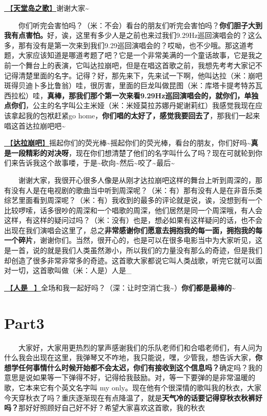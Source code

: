 \documentclass[]{ctexbook}
\begin{document}
\hyperref[haven-song]{🎵【\textbf{天堂岛之歌}】}谢谢大家\textasciitilde{}

  你们听完会害怕吗？（米：不会）看台的朋友们听完会害怕吗？\textbf{你们胆子大到我有点害怕。}好，诶，这里有多少人是之前也来过我们9.29Hz巡回演唱会的？这么多，那有没有是第一次来到我们9.29巡回演唱会的？哎呦，也不少哦。那这道考题，大家应该知道是哪道考题了吧？它是一个非常美满的一个童话故事，它是我之前一个舞台上的表演，它叫达拉崩吧，但是在唱这首歌之前，我想先考考大家记不记得清楚里面的名字。记得？好，那先来下，先来试一下啊，他叫达拉（米：崩吧斑得贝迪卜多比鲁翁）哇，很厉害，里面的巨龙叫做昆图（米：库塔卡提考特苏瓦西拉松）哇，\textbf{真棒，那我们那个第一次来看9.29Hz巡回演唱会的，就你们，单独点你们}，公主的名字叫公主米娅（米：米娅莫拉苏娜丹妮谢莉红）我感觉我现在应该拿起我的包袱赶紧go home，\textbf{你们唱的太好了，感觉我要回去了}，那我们一起来唱这首达拉崩吧吧\textasciitilde{}

\hyperref[dalabengba]{🎵【\textbf{达拉崩吧}】}摇起你们的荧光棒\textasciitilde 摇起你们的荧光棒，看台的朋友，你们好吗\textasciitilde{}\textbf{真是一段精彩的对决呀}，现在你们想清楚了他们的名字叫什么了吗？现在可就轮到你们来告诉我这个故事喽，于是\textasciitilde 砍向\textasciitilde 然后\textasciitilde 咬了\textasciitilde 最后\textasciitilde{}

  谢谢大家，我很开心很多人像是从刚才达拉崩吧这样的舞台上听到周深的，那有没有人是在电视剧的歌曲当中听到周深呢？（米：有）那有没有人是在非音乐类综艺里面看到周深呢？（米：有）我收到的最多的评论就是说，诶，没想到有一个比较啰嗦，话多很吵的周深和一个唱歌的周深，他们居然是同一个周深哦，有人会这样，有这样的疑问过吗？（米：没有）也是，想必如果有这样疑问的话，也不会出现在我们演唱会这里了，总之\textbf{非常感谢你们愿意去拥抱我的每一面，拥抱我的每一个碎片}，谢谢你们。当然，很开心的，也是可以在很多电影当中为大家听见，这是一首，说的就是我们人类虽然渺小，所以我们的力量没有那么的奇迹，但是我们却创造了很多非常非常多的奇迹。这首歌大家都说它叫人类战歌，听完它就可以面对一切，这首歌叫做（米：人是）人是\_

\hyperref[renshi]{🎵【\textbf{人是\_}】}全场和我一起好吗？（深：让时空消亡我\textasciitilde）\textbf{你们都是最棒的\textasciitilde{}}

\section{Part3}\label{chongqing-20241007-part3}

  大家好，大家用更热烈的掌声感谢我们的乐队老师们和合唱老师们，有人问为什么我会出现在这里，我弹琴又不咋地，我只能说，嘿，少管我，想告诉大家，\textbf{你想学任何事情什么时候开始都不会太迟，你们有接收到这个信息吗？}确定吗？我的意思是说如果等一下弹得不好，记得给我鼓励。对，等一下要弹的是非常温暖的歌，它本来它有个英文名字叫 my only。现在他有个很深情的歌叫我的秋衣，大家今天穿秋衣了吗？重庆逐渐现在有点降温了，就是\textbf{天气冷的话要记得穿秋衣秋裤好吗？}那好好照顾好自己好不好？希望大家喜欢这首歌，我的秋衣
\end{document}
